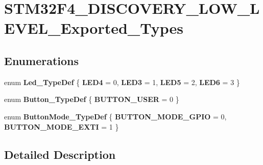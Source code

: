 \hypertarget{group___s_t_m32_f4___d_i_s_c_o_v_e_r_y___l_o_w___l_e_v_e_l___exported___types}{}\section{S\+T\+M32\+F4\+\_\+\+D\+I\+S\+C\+O\+V\+E\+R\+Y\+\_\+\+L\+O\+W\+\_\+\+L\+E\+V\+E\+L\+\_\+\+Exported\+\_\+\+Types}
\label{group___s_t_m32_f4___d_i_s_c_o_v_e_r_y___l_o_w___l_e_v_e_l___exported___types}
\subsection*{Enumerations}
\begin{DoxyCompactItemize}
\item 
\hypertarget{group___s_t_m32_f4___d_i_s_c_o_v_e_r_y___l_o_w___l_e_v_e_l___exported___types_gaa059704b7ca945eb9c1e7f2c3d03fecd}{}enum {\bfseries Led\+\_\+\+Type\+Def} \{ {\bfseries L\+E\+D4} = 0, 
{\bfseries L\+E\+D3} = 1, 
{\bfseries L\+E\+D5} = 2, 
{\bfseries L\+E\+D6} = 3
 \}\label{group___s_t_m32_f4___d_i_s_c_o_v_e_r_y___l_o_w___l_e_v_e_l___exported___types_gaa059704b7ca945eb9c1e7f2c3d03fecd}

\item 
\hypertarget{group___s_t_m32_f4___d_i_s_c_o_v_e_r_y___l_o_w___l_e_v_e_l___exported___types_ga643816dfbad5c734fc25a29ce8d35bb1}{}enum {\bfseries Button\+\_\+\+Type\+Def} \{ {\bfseries B\+U\+T\+T\+O\+N\+\_\+\+U\+S\+E\+R} = 0
 \}\label{group___s_t_m32_f4___d_i_s_c_o_v_e_r_y___l_o_w___l_e_v_e_l___exported___types_ga643816dfbad5c734fc25a29ce8d35bb1}

\item 
\hypertarget{group___s_t_m32_f4___d_i_s_c_o_v_e_r_y___l_o_w___l_e_v_e_l___exported___types_ga48825b7c7d851c440ef8e808fd9d8f0a}{}enum {\bfseries Button\+Mode\+\_\+\+Type\+Def} \{ {\bfseries B\+U\+T\+T\+O\+N\+\_\+\+M\+O\+D\+E\+\_\+\+G\+P\+I\+O} = 0, 
{\bfseries B\+U\+T\+T\+O\+N\+\_\+\+M\+O\+D\+E\+\_\+\+E\+X\+T\+I} = 1
 \}\label{group___s_t_m32_f4___d_i_s_c_o_v_e_r_y___l_o_w___l_e_v_e_l___exported___types_ga48825b7c7d851c440ef8e808fd9d8f0a}

\end{DoxyCompactItemize}


\subsection{Detailed Description}

